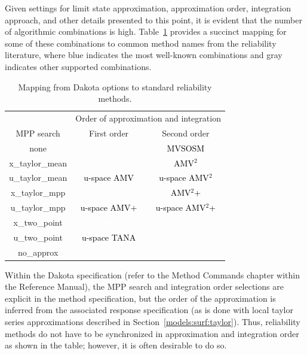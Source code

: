 Given settings for limit state approximation, approximation order,
integration approach, and other details presented to this point, it is
evident that the number of algorithmic combinations is high.
Table~\ref{tab:rel_meth_map} provides a succinct mapping for some of
these combinations to common method names from the reliability
literature, where blue indicates the most well-known combinations and
gray indicates other supported combinations.
\begin{table}
\centering
\caption{Mapping from Dakota options to standard reliability methods.}
\label{tab:rel_meth_map}
\begin{tabular}{|c|c|c|}
\hline
& \multicolumn{2}{c|}{Order of approximation and integration} \\ \cline{2-3}
MPP search      & First order & Second order                        \\ \hline
none            & \cellcolor{blue}\textcolor{white}{MVFOSM}
                & \cellcolor[gray]{0.5}\textcolor{black}{MVSOSM}   \\ \hline
x\_taylor\_mean & \cellcolor{blue}\textcolor{white}{AMV}
                & \cellcolor[gray]{0.5}\textcolor{black}{AMV$^2$}  \\ \hline
u\_taylor\_mean & \cellcolor[gray]{0.5}\textcolor{black}{u-space AMV}
                & \cellcolor[gray]{0.5}\textcolor{black}{u-space AMV$^2$} \\
\hline
x\_taylor\_mpp  & \cellcolor{blue}\textcolor{white}{AMV+}
                & \cellcolor[gray]{0.5}\textcolor{black}{AMV$^2$+} \\ \hline
u\_taylor\_mpp  & \cellcolor[gray]{0.5}\textcolor{black}{u-space AMV+}
                & \cellcolor[gray]{0.5}\textcolor{black}{u-space AMV$^2$+} \\
\hline
x\_two\_point   & \cellcolor{blue}\textcolor{white}{TANA}
                & \cellcolor[gray]{0.5}                             \\ \hline
u\_two\_point   & \cellcolor[gray]{0.5}\textcolor{black}{u-space TANA}
                & \cellcolor[gray]{0.5}                             \\ \hline
no\_approx      & \cellcolor{blue}\textcolor{white}{FORM}
                & \cellcolor{blue}\textcolor{white}{SORM}           \\ \hline
\end{tabular}
\end{table}

Within the Dakota specification (refer to the Method Commands chapter
within the Reference Manual), the MPP search and integration order
selections are explicit in the method specification, but the order of
the approximation is inferred from the associated response
specification (as is done with local taylor series approximations
described in Section~\ref{models:surf:taylor}). Thus, reliability
methods do not have to be synchronized in approximation and
integration order as shown in the table; however, it is often
desirable to do so.


